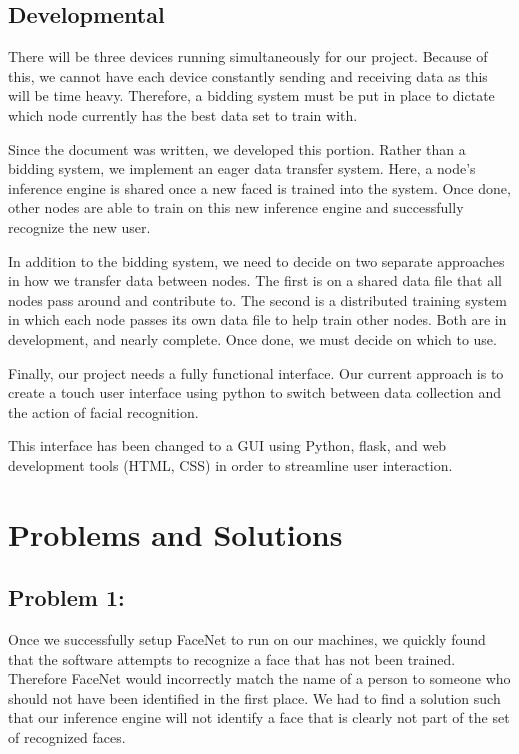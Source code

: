 \documentclass[onecolumn, draftclsnofoot,10pt, compsoc]{IEEEtran}
\begin{document}
    \subsection{Developmental}
    There will be three devices running simultaneously for our project. Because of this, we cannot have each device constantly sending and receiving data as this will be time heavy. Therefore, a bidding system must be put in place to dictate which node currently has the best data set to train with.
    
    Since the document was written, we developed this portion. Rather than a bidding system, we implement an eager data transfer system. Here, a node's inference engine is shared once a new faced is trained into the system. Once done, other nodes are able to train on this new inference engine and successfully recognize the new user.
    
    In addition to the bidding system, we need to decide on two separate approaches in how we transfer data between nodes. The first is on a shared data file that all nodes pass around and contribute to. The second is a distributed training system in which each node passes its own data file to help train other nodes. Both are in development, and nearly complete. Once done, we must decide on which to use.
    
    Finally, our project needs a fully functional interface. Our current approach is to create a touch user interface using python to switch between data collection and the action of facial recognition.
    
    This interface has been changed to a GUI using Python, flask, and web development tools (HTML, CSS) in order to streamline user interaction.
    

\section{Problems and Solutions}
    \subsection{Problem 1:} Once we successfully setup FaceNet to run on our machines, we quickly found that the software attempts to recognize a face that has not been trained. Therefore FaceNet would incorrectly match the name of a person to someone who should not have been identified in the first place. We had to find a solution such that our inference engine will not identify a face that is clearly not part of the set of recognized faces. 
\end{document}
